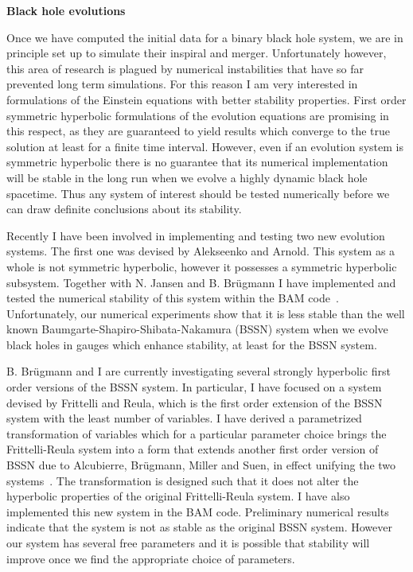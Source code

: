 \documentclass[11pt]{article}
\begin{document}
\begin{spacing}{0.95}
\medskip
\noindent
{\bf Black hole evolutions}
\smallskip

Once we have computed the initial data for a binary black hole system, we
are in principle set up to simulate their inspiral and merger. Unfortunately
however, this area of research is plagued by numerical instabilities that
have so far prevented long term simulations. For this reason I am very
interested in formulations of the Einstein equations with better stability
properties. First order symmetric hyperbolic formulations of the evolution
equations are promising in this respect, as they are guaranteed to yield
results which converge to the true solution at least for a finite time
interval. However, even if an evolution system is symmetric hyperbolic there
is no guarantee that its numerical implementation will be stable in the long
run when we evolve a highly dynamic black hole spacetime. Thus any system
of interest should be tested numerically before we can draw
definite conclusions about its stability.

Recently I have been involved in implementing and testing two new evolution
systems. The first one was devised by Alekseenko and Arnold. This system as
a whole is not symmetric hyperbolic, however it possesses a symmetric
hyperbolic subsystem. Together with N. Jansen and B. Br\"ugmann I have
implemented and tested the numerical stability of this system within the BAM
code~\cite{Jansen03}. Unfortunately, our numerical experiments show that it
is less stable than the well known Baumgarte-Shapiro-Shibata-Nakamura (BSSN)
system when we evolve black holes in gauges which enhance stability, at
least for the BSSN system.

B. Br\"ugmann and I are currently investigating several strongly hyperbolic
first order versions of the BSSN system. In particular, I have focused on a
system devised by Frittelli and Reula, which is the first order extension of
the BSSN system with the least number of variables. I have derived a
parametrized transformation of variables which for a particular parameter
choice brings the Frittelli-Reula system into a form that extends another
first order version of BSSN due to Alcubierre, Br\"{u}gmann, Miller and
Suen, in effect unifying the two systems~\cite{Tichy04}.
The transformation is designed
such that it does not alter the hyperbolic properties of the original
Frittelli-Reula system. I have also implemented this new system in the BAM
code. Preliminary numerical results indicate that the system is not as stable
as the original BSSN system. However our system has several free parameters
and it is possible that stability will improve once we find the 
appropriate choice of parameters.


\end{spacing}
\end{document}
